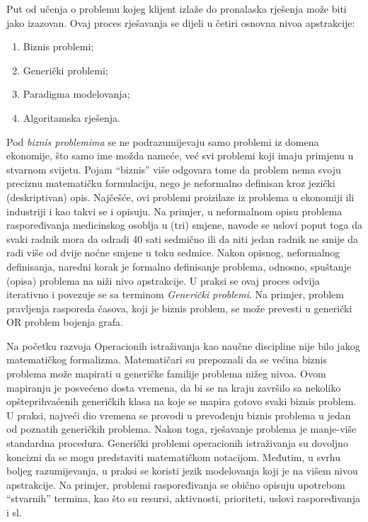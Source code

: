\documentclass[a4paper, utf8, 11pt, colorlinks]{book}
\theoremstyle{definition}
\begin{document}
  Put od učenja o problemu kojeg klijent izlaže do pronalaska rješenja može biti jako izazovan. Ovaj proces rješavanja se  dijeli u četiri osnovna nivoa apstrakcije:
  \begin{enumerate}
      \item Biznis problemi;
      \item Generički problemi; 
      \item Paradigma modelovanja;
      \item Algoritamska rješenja. 
  \end{enumerate}
  
 Pod \emph{biznis problemima}  se ne podrazumijevaju samo problemi iz domena ekonomije, što samo ime možda nameće, već svi problemi koji imaju primjenu u stvarnom svijetu. Pojam ``biznis'' više odgovara tome da problem nema svoju preciznu matematičku formulaciju, nego je neformalno definisan kroz jezički (deskriptivan) opis.  Najčešće, ovi problemi proizilaze iz problema u ekonomiji ili industriji i kao takvi se i opisuju. Na primjer, u neformalnom opisu problema raspoređivanja medicinskog osoblja u (tri) smjene, navode se uslovi poput toga da svaki radnik mora da odradi 40 sati sedmično ili da niti jedan radnik ne smije da radi više od dvije noćne smjene u toku sedmice. Nakon opisnog, neformalnog definisanja, naredni korak 
 je formalno definisanje problema, odnosno, spuštanje (opisa) problema na niži nivo apstrakcije. U praksi se ovaj proces odvija iterativno i povezuje se sa terminom \emph{Generički problemi}. Na primjer, problem pravljenja rasporeda časova, koji je biznis problem, se može prevesti u generički OR problem bojenja grafa.

Na početku razvoja Operacionih istraživanja kao naučne discipline nije bilo jakog matematičkog formalizma. Matematičari su prepoznali da se većina biznis problema može  mapirati u generičke familije problema nižeg nivoa. Ovom mapiranju je posvećeno dosta vremena, da bi se na kraju završilo sa nekoliko opšteprihvaćenih generičkih klasa na koje se mapira gotovo svaki biznis problem. U praksi, najveći dio vremena se provodi u prevođenju biznis problema u jedan od poznatih generičkih problema. Nakon toga, rješavanje problema je manje-više standardna procedura. Generički problemi operacionih istraživanja su dovoljno koncizni da se mogu predstaviti  matematičkom notacijom. Međutim, u svrhu boljeg razumijevanja, u praksi se koristi jezik modelovanja koji je na višem nivou apstrakcije. Na primjer, problemi raspoređivanja se obično opisuju upotrebom ``stvarnih'' termina, kao što su resursi, aktivnosti, prioriteti, uslovi raspoređivanja i sl.  
\end{document}
